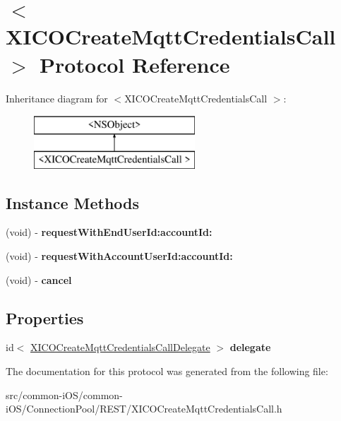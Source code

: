 \hypertarget{protocol_x_i_c_o_create_mqtt_credentials_call_01-p}{}\section{$<$X\+I\+C\+O\+Create\+Mqtt\+Credentials\+Call $>$ Protocol Reference}
\label{protocol_x_i_c_o_create_mqtt_credentials_call_01-p}
Inheritance diagram for $<$X\+I\+C\+O\+Create\+Mqtt\+Credentials\+Call $>$\+:\begin{figure}[H]
\begin{center}
\leavevmode
\includegraphics[height=2.000000cm]{protocol_x_i_c_o_create_mqtt_credentials_call_01-p}
\end{center}
\end{figure}
\subsection*{Instance Methods}
\begin{DoxyCompactItemize}
\item 
\hypertarget{protocol_x_i_c_o_create_mqtt_credentials_call_01-p_a31c995ab0b6cfd50dc0ab5f967c9ca0c}{}\label{protocol_x_i_c_o_create_mqtt_credentials_call_01-p_a31c995ab0b6cfd50dc0ab5f967c9ca0c} 
(void) -\/ {\bfseries request\+With\+End\+User\+Id\+:account\+Id\+:}
\item 
\hypertarget{protocol_x_i_c_o_create_mqtt_credentials_call_01-p_a87e7ee78a536ca2ba3391124cdc1b8a8}{}\label{protocol_x_i_c_o_create_mqtt_credentials_call_01-p_a87e7ee78a536ca2ba3391124cdc1b8a8} 
(void) -\/ {\bfseries request\+With\+Account\+User\+Id\+:account\+Id\+:}
\item 
\hypertarget{protocol_x_i_c_o_create_mqtt_credentials_call_01-p_a177abe0be0ec5b373bc30a18b375cbdc}{}\label{protocol_x_i_c_o_create_mqtt_credentials_call_01-p_a177abe0be0ec5b373bc30a18b375cbdc} 
(void) -\/ {\bfseries cancel}
\end{DoxyCompactItemize}
\subsection*{Properties}
\begin{DoxyCompactItemize}
\item 
\hypertarget{protocol_x_i_c_o_create_mqtt_credentials_call_01-p_a8dd67307acb83f98f34d959fbf128843}{}\label{protocol_x_i_c_o_create_mqtt_credentials_call_01-p_a8dd67307acb83f98f34d959fbf128843} 
id$<$ \hyperlink{protocol_x_i_c_o_create_mqtt_credentials_call_delegate-p}{X\+I\+C\+O\+Create\+Mqtt\+Credentials\+Call\+Delegate} $>$ {\bfseries delegate}
\end{DoxyCompactItemize}


The documentation for this protocol was generated from the following file\+:\begin{DoxyCompactItemize}
\item 
src/common-\/i\+O\+S/common-\/i\+O\+S/\+Connection\+Pool/\+R\+E\+S\+T/X\+I\+C\+O\+Create\+Mqtt\+Credentials\+Call.\+h\end{DoxyCompactItemize}
